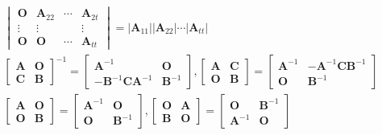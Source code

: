\documentclass[12pt]{book}
\begin{document}
\begin{enumerate}[1.]
\begin{gather*}
\begin{vmatrix}
                  \bm{O}      & \bm{A}_{22} & \cdots & \bm{A}_{2t} \\
                  \vdots      & \vdots      &        & \vdots      \\
                  \bm{O}      & \bm{O}      & \cdots & \bm{A}_{tt}
              \end{vmatrix}
              = |\bm{A}_{11}| |\bm{A}_{22}| \cdots |\bm{A}_{tt}| \\
              \begin{bmatrix}
                  \bm{A} & \bm{O} \\
                  \bm{C} & \bm{B}
              \end{bmatrix}^{-1}
              =\begin{bmatrix}
                  \bm{A}^{-1}                   & \bm{O}      \\
                  -\bm{B}^{-1}\bm{C}\bm{A}^{-1} & \bm{B}^{-1}
              \end{bmatrix},
              \begin{bmatrix}
                  \bm{A} & \bm{C} \\
                  \bm{O} & \bm{B}
              \end{bmatrix}
              =\begin{bmatrix}
                  \bm{A}^{-1} & -\bm{A}^{-1}\bm{C}\bm{B}^{-1} \\
                  \bm{O}      & \bm{B}^{-1}
              \end{bmatrix}\\
              \begin{bmatrix}
                  \bm{A} & \bm{O} \\
                  \bm{O} & \bm{B}
              \end{bmatrix}
              = \begin{bmatrix}
                  \bm{A}^{-1} & \bm{O}      \\
                  \bm{O}      & \bm{B}^{-1}
              \end{bmatrix},
              \begin{bmatrix}
                  \bm{O} & \bm{A} \\
                  \bm{B} & \bm{O}
              \end{bmatrix}
              =\begin{bmatrix}
                  \bm{O}      & \bm{B}^{-1} \\
                  \bm{A}^{-1} & \bm{O}
              \end{bmatrix}

\end{gather*}
\end{enumerate}
\end{document}
